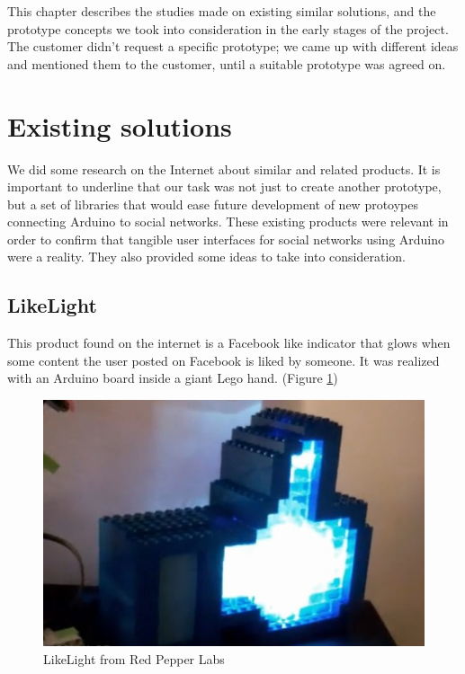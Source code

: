 
This chapter describes the studies made on existing similar solutions,
and the prototype concepts we took into consideration in the early stages of the project.
The customer didn't request a specific prototype; we came up with different ideas and mentioned
them to the customer, until a suitable prototype was agreed on.

\section{Existing solutions}
We did some research on the Internet about similar and related products. It is important to underline that our task was
not just to create another prototype, but a set of libraries that would ease future development of new protoypes
connecting Arduino to social networks. These existing products were relevant in order to confirm that tangible user interfaces
for social networks using Arduino were a reality. They also provided some ideas to take into consideration.

\newpage

\subsection{LikeLight}
This product found on the internet\cite{link:likelight} is a Facebook like indicator that glows when some content the
user posted on Facebook is liked by someone. It was realized with an Arduino board inside a giant Lego hand.
(Figure \ref{fig:prestudies-likehand})

\begin{figure}[h!]
\centering \includegraphics[scale=0.85]{img/prestudies-likehand}
\caption{LikeLight from Red Pepper Labs\cite{link:likelight}}
\label{fig:prestudies-likehand}
\end{figure}

